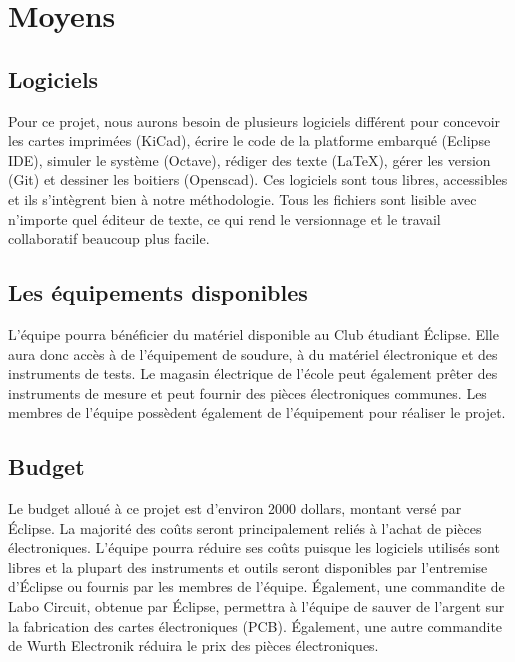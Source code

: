 \section{Moyens}

\subsection{Logiciels}
Pour ce projet, nous aurons besoin de plusieurs logiciels différent pour concevoir les cartes imprimées (KiCad), écrire le code de la platforme embarqué (Eclipse IDE), simuler le système (Octave), rédiger des texte (LaTeX), gérer les version (Git) et dessiner les boitiers (Openscad). Ces logiciels sont tous libres, accessibles et ils s'intègrent bien à notre méthodologie. Tous les fichiers sont lisible avec n'importe quel éditeur de texte, ce qui rend le versionnage et le travail collaboratif beaucoup plus facile.\\

\subsection{Les équipements disponibles}
L'équipe pourra bénéficier du matériel disponible au Club étudiant Éclipse. Elle aura donc accès à de l'équipement de soudure, à du matériel électronique et des instruments de tests. Le magasin électrique de l'école peut également prêter des instruments de mesure et peut fournir des pièces électroniques communes. Les membres de l'équipe possèdent également de l'équipement pour réaliser le projet.

\subsection{Budget}
Le budget alloué à ce projet est d'environ 2000 dollars, montant versé par Éclipse. La majorité des coûts seront principalement reliés à l'achat de pièces électroniques. L'équipe pourra réduire ses coûts puisque les logiciels utilisés sont libres et la plupart des instruments et outils seront disponibles par l'entremise d'Éclipse ou fournis par les membres de l'équipe. Également, une commandite de Labo Circuit, obtenue par Éclipse, permettra à l'équipe de sauver de l'argent sur la fabrication des cartes électroniques (PCB). Également, une autre commandite de Wurth Electronik réduira le prix des pièces électroniques.

